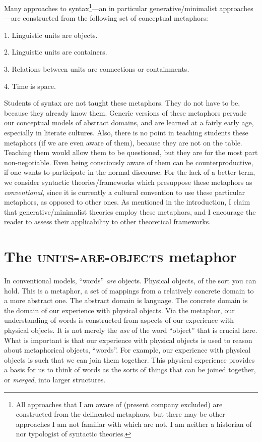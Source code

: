   Many approaches to syntax\footnote{All approaches that I am aware of (present company excluded) are constructed from the delineated metaphors, but there may be other approaches I am not familiar with which are not. I am neither a historian of nor typologist of syntactic theories.}—an in particular generative/minimalist approaches—are constructed from the following set of conceptual metaphors: 

1. Linguistic units are objects.

2. Linguistic units are containers.

3. Relations between units are connections or containments.

4. Time is space.

  Students of syntax are not taught these metaphors. They do not have to be, because they already know them. Generic versions of these metaphors pervade our conceptual models of abstract domains, and are learned at a fairly early age, especially in literate cultures. Also, there is no point in teaching students these metaphors (if we are even aware of them), because they are not on the table. Teaching them would allow them to be questioned, but they are for the most part non-negotiable. Even being consciously aware of them can be counterproductive, if one wants to participate in the normal discourse. For the lack of a better term, we consider syntactic theories/frameworks which presuppose these metaphors as \textit{conventional}, since it is currently a cultural convention to use these particular metaphors, as opposed to other ones. As mentioned in the introduction, I claim that generative/minimalist theories employ these metaphors, and I encourage the reader to assess their applicability to other theoretical frameworks.

\section{{The} {\textsc{units-}}{\textsc{are}}{\textsc{{}-objects}}{ metaphor}} 

In conventional models, “words” \textit{are} objects. Physical objects, of the sort you can hold. This is a metaphor, a set of mappings from a relatively concrete domain to a more abstract one. The abstract domain is language. The concrete domain is the domain of our experience with physical objects. Via the metaphor, our understanding of words is constructed from aspects of our experience with physical objects. It is not merely the \textit{use} of the word “object” that is crucial here. What is important is that our experience with physical objects is used to reason about metaphorical objects, “words”. For example, our experience with physical objects is such that we can join them together. This physical experience provides a basis for us to think of words as the sorts of things that can be joined together, or \textit{merged}, into larger structures.

